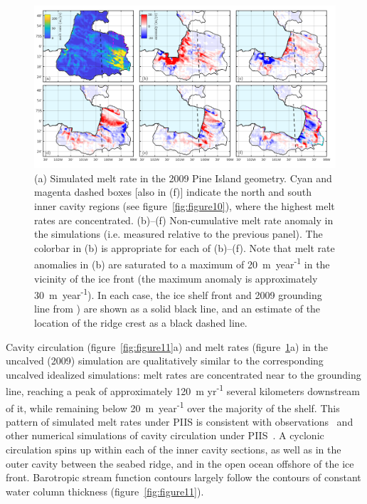 \documentclass[draft]{agujournal2019}
\begin{document}
\begin{figure}
    \centering
    \includegraphics[width = \textwidth]{../make_figures/plots/figure12.pdf}
    \caption{(a) Simulated melt rate in the 2009 Pine Island geometry. Cyan and magenta dashed boxes [also in (f)] indicate the north and south inner cavity regions (see figure~\ref{fig:figure10}), where the highest melt rates are concentrated. (b)--(f) Non-cumulative melt rate anomaly in the simulations (i.e. measured relative to the previous panel). The colorbar in (b) is appropriate for each of (b)--(f). Note that melt rate anomalies in (b) are saturated to a maximum of 20~m~year\textsuperscript{-1} in the vicinity of the ice front (the maximum anomaly is approximately 30~m~year\textsuperscript{-1}). In each case, the ice shelf front and 2009 grounding line from ) are shown as a solid black line, and an estimate of the location of the ridge crest as a black dashed line.}
    \label{fig:figure12}
\end{figure}


Cavity circulation (figure~\ref{fig:figure11}a) and melt rates (figure~\ref{fig:figure12}a) in the uncalved (2009) simulation are qualitatively similar to the corresponding uncalved idealized simulations: melt rates are concentrated near to the grounding line, reaching a peak of approximately 120~m yr\textsuperscript{-1} several kilometers downstream of it, while remaining below 20~m~year\textsuperscript{-1} over the majority of the shelf. This pattern of simulated melt rates under PIIS is consistent with observations~\cite{Dutrieux2013Cryosphere} and other numerical simulations of cavity circulation under PIIS~\cite[for example]{Heimbach2012AnnGlac}. A cyclonic circulation spins up within each of the inner cavity sections, as well as in the outer cavity between the seabed ridge, and in the open ocean offshore of the ice front. Barotropic stream function contours largely follow the contours of constant water column thickness (figure~\ref{fig:figure11}).
\end{document}
